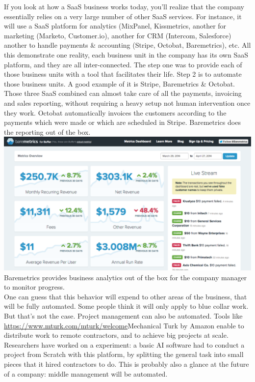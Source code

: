 \documentclass[12pt]{article}
\begin{document}
If you look at how a SaaS business works today, you'll realize that the company essentially relies on a very large number of other SaaS services. For instance, it will use a SaaS platform for analytics (MixPanel, Kissmetrics, another for marketing (Marketo, Customer.io), another for CRM (Intercom, Salesforce) another to handle payments & accounting (Stripe, Octobat, Baremetrics), etc.
All this demonstrate one reality, each business unit in the company has its own SaaS platform, and they are all inter-connected. The step one was to provide each of those business units with a tool that facilitates their life. Step 2 is to automate those business units. A good example of it is Stripe, Baremetrics & Octobat. Those three SaaS combined can almost take care of all the payments, invoicing and sales reporting, without requiring a heavy setup not human intervention once they work. Octobat automatically invoices the customers according to the payments which were made or which are scheduled in Stripe. Baremetrics does the reporting out of the box.
\\

\includegraphics[width=\textwidth]{baremetrics}
Baremetrics provides business analytics out of the box for the company manager to monitor progress.
\\

One can guess that this behavior will expend to other areas of the business, that will be fully automated. Some people think it will only apply to blue collar work. But that's not the case. Project management can also be automated. Tools like \url{https://www.mturk.com/mturk/welcome}{Mechanical Turk} by Amazon enable to distribute work to remote contractors, and to achieve big projects at scale. Researchers have worked on a experiment: a basic AI software had to conduct a project from Scratch with this platform, by splitting the general task into small pieces that it hired contractors to do. This is probably also a glance at the future of a company: middle management will be automated.
\\
\end{document}
